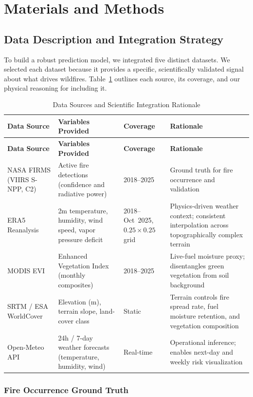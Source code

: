 \documentclass[11pt]{article}
\begin{document}
\section{Materials and Methods}

\subsection{Data Description and Integration Strategy}

To build a robust prediction model, we integrated five distinct datasets. We selected each dataset because it provides a specific, scientifically validated signal about what drives wildfires. Table~\ref{tab:data_sources} outlines each source, its coverage, and our physical reasoning for including it.

\begin{longtable}{|p{2.8cm}|p{3.6cm}|p{1.8cm}|p{3.9cm}|}
\caption{Data Sources and Scientific Integration Rationale}
\label{tab:data_sources}\\
\hline
\textbf{Data Source} & \textbf{Variables Provided} & \textbf{Coverage} & \textbf{Rationale} \\
\hline
\endfirsthead
\hline
\textbf{Data Source} & \textbf{Variables Provided} & \textbf{Coverage} & \textbf{Rationale} \\
\hline
\endhead
NASA FIRMS (VIIRS S-NPP, C2) & Active fire detections (confidence and radiative power) & 2018--2025 & Ground truth for fire occurrence and validation \\
\hline
ERA5 Reanalysis & 2m temperature, humidity, wind speed, vapor pressure deficit & 2018--Oct~2025, $0.25 \times 0.25$ grid & Physics-driven weather context; consistent interpolation across topographically complex terrain \\
\hline
MODIS EVI & Enhanced Vegetation Index (monthly composites) & 2018--2025 & Live-fuel moisture proxy; disentangles green vegetation from soil background \\
\hline
SRTM / ESA WorldCover & Elevation (m), terrain slope, land-cover class & Static & Terrain controls fire spread rate, fuel moisture retention, and vegetation composition \\
\hline
Open-Meteo API & 24h / 7-day weather forecasts (temperature, humidity, wind) & Real-time & Operational inference; enables next-day and weekly risk visualization \\
\hline
\end{longtable}

\noindent
\subsubsection{Fire Occurrence Ground Truth}
\end{document}
